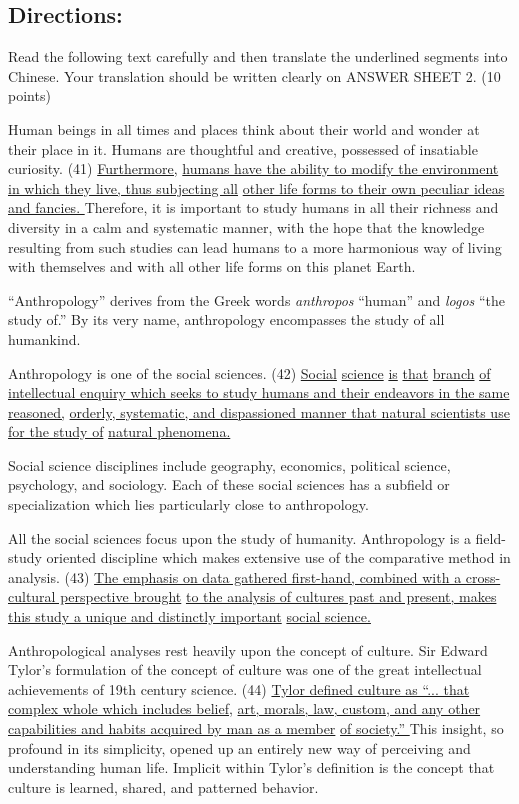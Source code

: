 \documentclass[UTF8,11pt]{ctexart}
\begin{document}
\subsection*{\textbf{Directions:}}


Read the following text carefully and then translate the underlined segments into Chinese. Your translation should be written clearly on ANSWER SHEET 2. (10 points)


Human beings in all times and places think about their world and wonder at their place in it. Humans are thoughtful and creative, possessed of insatiable curiosity. (41) \uline{Furthermore,} \uline{humans have the ability to modify the environment in which they live, thus subjecting all} \uline{other life forms to their own peculiar ideas and fancies. }Therefore, it is important to study humans in all their richness and diversity in a calm and systematic manner, with the hope that the knowledge resulting from such studies can lead humans to a more harmonious way of living with themselves and with all other life forms on this planet Earth.


“Anthropology” derives from the Greek words \textit{anthropos} “human” and \textit{logos} “the study of.” By its very name, anthropology encompasses the study of all humankind.


Anthropology is one of the social sciences. (42) \uline{Social} \uline{science} \uline{is} \uline{that} \uline{branch} \uline{of} \uline{intellectual enquiry which seeks to study humans and their endeavors in the same reasoned,} \uline{orderly, systematic, and dispassioned manner that natural scientists use for the study of} \uline{natural phenomena.}


Social science disciplines include geography, economics, political science, psychology, and sociology. Each of these social sciences has a subfield or specialization which lies particularly close to anthropology.


All the social sciences focus upon the study of humanity. Anthropology is a field-study oriented discipline which makes extensive use of the comparative method in analysis. (43) \uline{The emphasis on data gathered first-hand, combined with a cross-cultural perspective brought} \uline{to the analysis of cultures past and present, makes this study a unique and distinctly important} \uline{social science.}


Anthropological analyses rest heavily upon the concept of culture. Sir Edward Tylor’s formulation of the concept of culture was one of the great intellectual achievements of 19th century science. (44) \uline{Tylor defined culture as “... that complex whole which includes belief,} \uline{art, morals, law, custom, and any other capabilities and habits acquired by man as a member} \uline{of society.” }This insight, so profound in its simplicity, opened up an entirely new way of perceiving and understanding human life. Implicit within Tylor’s definition is the concept that culture is learned, shared, and patterned behavior.
\end{document}
